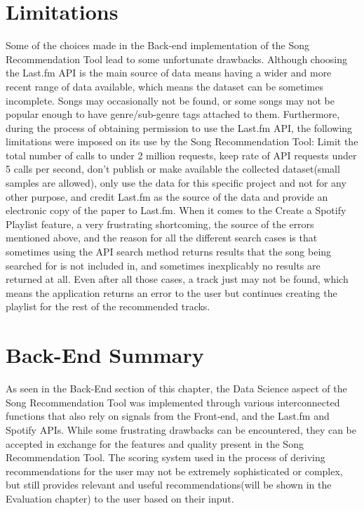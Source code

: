 \documentclass{l4proj}
\begin{document}
\section{Limitations}
Some of the choices made in the Back-end implementation of the Song Recommendation Tool lead to some unfortunate drawbacks. Although choosing the Last.fm API is the main source of data means having a wider and more recent range of data available, which means the dataset can be sometimes incomplete. Songs may occasionally not be found, or some songs may not be popular enough to have genre/sub-genre tags attached to them. Furthermore, during the process of obtaining permission to use the Last.fm API, the following limitations were imposed on its use by the Song Recommendation Tool: Limit the total number of calls to under 2 million requests, keep rate of API requests under 5 calls per second, don't publish or make available the collected dataset(small samples are allowed), only use the data for this specific project and not for any other purpose, and credit Last.fm as the source of the data and provide an electronic copy of the paper to Last.fm. When it comes to the Create a Spotify Playlist feature, a very frustrating shortcoming, the source of the errors mentioned above, and the reason for all the different search cases is that sometimes using the API search method returns results that the song being searched for is not included in, and sometimes inexplicably no results are returned at all. Even after all those cases, a track just may not be found, which means the application returns an error to the user but continues creating the playlist for the rest of the recommended tracks.
\section{Back-End Summary}
As seen in the Back-End section of this chapter, the Data Science aspect of the Song Recommendation Tool was implemented through various interconnected functions that also rely on signals from the Front-end, and the Last.fm and Spotify APIs. While some frustrating drawbacks can be encountered, they can be accepted in exchange for the features and quality present in the Song Recommendation Tool. The scoring system used in the process of deriving recommendations for the user may not be extremely sophisticated or complex, but still provides relevant and useful recommendations(will be shown in the Evaluation chapter) to the user based on their input.
\end{document}
